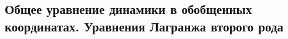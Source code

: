 

\subsection{Общее уравнение динамики в обобщенных координатах. Уравнения Лагранжа второго рода}



